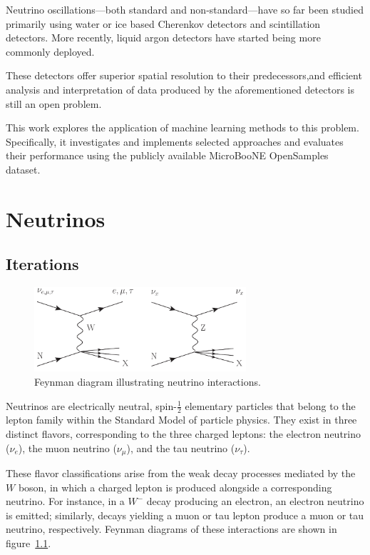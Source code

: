 \documentclass{pracalicmgr}
\begin{document}
Neutrino oscillations—both standard and non-standard—have so far been studied primarily using water or ice based Cherenkov detectors and scintillation detectors. More recently, liquid argon detectors have started being more commonly deployed.

These detectors offer superior spatial resolution to their predecessors,and efficient analysis and interpretation of data produced by the aforementioned detectors is still an open problem.

This work explores the application of machine learning methods to this problem. Specifically, it investigates and implements selected approaches and evaluates their performance using the publicly available MicroBooNE OpenSamples dataset.

\chapter{Neutrinos}

\section{Iterations}

\begin{figure}[h]
    \centering
    \includegraphics[width=0.7\textwidth]{src/xfig1_3nu.pdf}
    \caption{Feynman diagram illustrating neutrino interactions.}
    \label{fig:Feynman_diagram_neutrino}
\end{figure}

Neutrinos are electrically neutral, spin-$\frac{1}{2}$ elementary particles that belong to the lepton family within the Standard Model of particle physics. They exist in three distinct flavors, corresponding to the three charged leptons: the electron neutrino ($\nu_e$), the muon neutrino ($\nu_\mu$), and the tau neutrino ($\nu_\tau$).

These flavor classifications arise from the weak decay processes mediated by the $W$ boson, in which a charged lepton is produced alongside a corresponding neutrino. For instance, in a $W^-$ decay producing an electron, an electron neutrino is emitted; similarly, decays yielding a muon or tau lepton produce a muon or tau neutrino, respectively. Feynman diagrams of these interactions are shown in figure~\ref{fig:Feynman_diagram_neutrino}.
\end{document}
